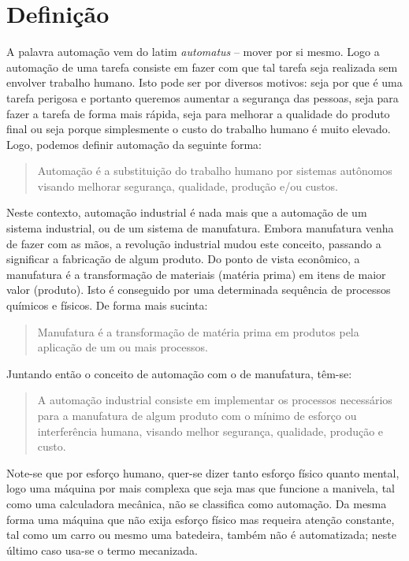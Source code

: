 \section{Definição}
A palavra automação vem do latim \emph{automatus} -- mover por si mesmo. Logo a automação de uma tarefa consiste em fazer com que tal tarefa seja realizada sem envolver trabalho humano. Isto pode ser por diversos motivos: seja por que é uma tarefa perigosa e portanto queremos aumentar a segurança das pessoas, seja para fazer a tarefa de forma mais rápida, seja para melhorar a qualidade do produto final ou seja porque simplesmente o custo do trabalho humano é muito elevado. Logo, podemos definir automação da seguinte forma:
\begin{quote}
  Automação é a substituição do trabalho humano por sistemas autônomos visando melhorar segurança, qualidade, produção e/ou custos.
\end{quote}

Neste contexto, automação industrial é nada mais que a automação de um sistema industrial, ou de um sistema de manufatura. Embora manufatura venha de fazer com as mãos, a revolução industrial mudou este conceito, passando a significar a fabricação de algum produto. Do ponto de vista econômico, a manufatura é a transformação de materiais (matéria prima) em itens de maior valor (produto). Isto é conseguido por uma determinada sequência de processos químicos e físicos. De forma mais sucinta:
\begin{quote}
	Manufatura é a transformação de matéria prima em produtos pela aplicação de um ou mais processos.
\end{quote}

Juntando então o conceito de automação com o de manufatura, têm-se:
\begin{quote}
  A automação industrial consiste em implementar os processos necessários para a manufatura de algum produto com o mínimo de esforço ou interferência humana, visando melhor segurança, qualidade, produção e custo.
\end{quote}

Note-se que por esforço humano, quer-se dizer tanto esforço físico quanto mental, logo uma máquina por mais complexa que seja mas que funcione a manivela, tal como uma calculadora mecânica, não se classifica como automação. Da mesma forma uma máquina que não exija esforço físico mas requeira atenção constante, tal como um carro ou mesmo uma batedeira, também não é automatizada; neste último caso usa-se o termo mecanizada.

